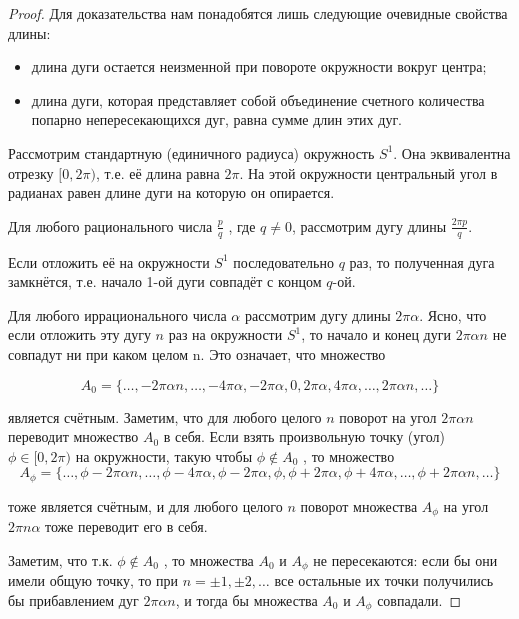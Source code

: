 \begin{proof}
Для доказательства нам понадобятся лишь следующие очевидные свойства длины:

	\begin{itemize}
	\item длина дуги остается неизменной при повороте окружности вокруг
	центра;
	\item длина дуги, которая представляет собой объединение счетного количества попарно непересекающихся дуг, равна сумме длин этих
	дуг.	
	\end{itemize}	

Рассмотрим стандартную (единичного радиуса) окружность $S^1$. Она эквивалентна отрезку $[0, 2\pi)$, т.е. её длина равна $2\pi$. На этой окружности центральный угол в радианах равен длине дуги на которую он опирается.

Для любого рационального числа $\frac{p}{q}$ , где $q\ne 0$, рассмотрим дугу длины $\frac{2\pi p}{q}$.

Если отложить её на окружности $S^1$ последовательно $q$ раз, то полученная дуга замкнётся, т.е. начало 1-ой дуги совпадёт с концом $q$-ой.

Для любого иррационального числа $\alpha$ рассмотрим дугу длины $2\pi\alpha$. Ясно, что если отложить эту дугу $n$ раз на окружности $S^1$, то начало и конец дуги $2\pi\alpha n$ не совпадут ни при каком целом n. Это означает, что множество

\begin{equation*}
	A_0 = \{\ldots, -2\pi\alpha n, \ldots , -4\pi\alpha, -2\pi\alpha, 0, 2\pi\alpha, 4\pi\alpha, \ldots , 2\pi\alpha n, \ldots\}
\end{equation*}

является счётным. Заметим, что для любого целого $n$ поворот на угол $2\pi\alpha n$ переводит множество $A_0$ в себя.
Если взять произвольную точку (угол) $\phi \in [0, 2\pi)$ на окружности, такую чтобы $\phi \notin A_0$ , то множество
\begin{equation*}
	A_\phi = \{\ldots , \phi - 2\pi\alpha n, \ldots , \phi - 4\pi\alpha, \phi - 2\pi\alpha, \phi, \phi + 2\pi\alpha, \phi + 4\pi\alpha, \ldots , \phi + 2\pi\alpha n, \ldots \}
\end{equation*}

тоже является счётным, и для любого целого $n$ поворот множества $A_\phi$ на угол $2\pi n\alpha$ тоже переводит его в себя. 

Заметим, что т.к. $\phi \notin A_0$ , то множества $A_0$
и $A_\phi$ не пересекаются: если бы они имели общую точку, то при $n=\pm1, \pm2, \ldots$ все остальные их точки получились бы прибавлением дуг $2\pi\alpha n$, и тогда бы множества $A_0$ и $A_\phi$ совпадали. 


\end{proof}
